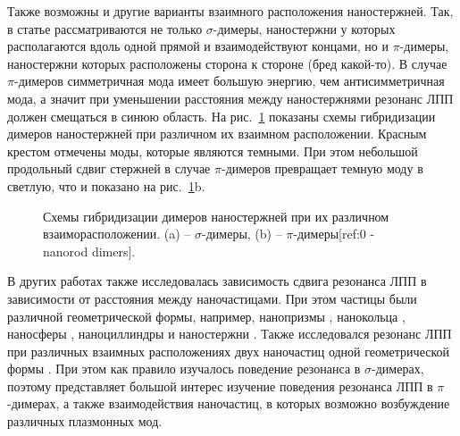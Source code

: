 Также возможны и другие варианты взаимного расположения наностержней. Так, в статье \cite{nanorods1} рассматриваются не только $ \sigma$-димеры, наностержни у которых располагаются вдоль одной прямой и взаимодействуют концами, но и $ \pi$-димеры, наностержни которых расположены сторона к стороне (бред какой-то). В случае $ \pi$-димеров симметричная мода имеет большую энергию, чем антисимметричная мода, а значит при уменьшении расстояния между наностержнями резонанс ЛПП должен смещаться в синюю область. На рис.~\ref{img:dimer_resonances} показаны схемы гибридизации димеров наностержней при различном их взаимном расположении. Красным крестом отмечены моды, которые являются темными. При этом небольшой продольный сдвиг стержней в случае $ \pi$-димеров превращает темную моду в светлую, что и показано на рис.~\ref{img:dimer_resonances}b. 

\begin{figure}[t]
\caption{Схемы гибридизации димеров наностержней при их различном взаиморасположении. (a) -- $ \sigma$-димеры, (b) -- $ \pi $-димеры[ref:0 - nanorod dimers].}
\label{img:dimer_resonances}
\end{figure}

В других работах также исследовалась зависимость сдвига резонанса ЛПП в зависимости от расстояния между наночастицами. При этом частицы были различной геометрической формы, например, нанопризмы \cite{nanoprism, nanoshells}, нанокольца \cite{nanoring}, наносферы \cite{nanospheres, nanospheres2}, наноциллиндры \cite{nanocyllinders} и наностержни \cite{nanorods}. Также исследовался резонанс ЛПП при различных взаимных расположениях двух наночастиц одной геометрической формы \cite{nanorods2, nanorods3, 3druler}. При этом как правило изучалось поведение резонанса в $ \sigma$-димерах, поэтому представляет большой интерес изучение поведения резонанса ЛПП в $ \pi$-димерах, а также взаимодействия наночастиц, в которых возможно возбуждение различных плазмонных мод.
